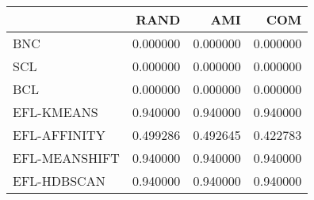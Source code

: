 \begin{tabular}{lrrr}
\toprule
 & RAND & AMI & COM \\
\midrule
BNC & 0.000000 & 0.000000 & 0.000000 \\
SCL & 0.000000 & 0.000000 & 0.000000 \\
BCL & 0.000000 & 0.000000 & 0.000000 \\
EFL-KMEANS & 0.940000 & 0.940000 & 0.940000 \\
EFL-AFFINITY & 0.499286 & 0.492645 & 0.422783 \\
EFL-MEANSHIFT & 0.940000 & 0.940000 & 0.940000 \\
EFL-HDBSCAN & 0.940000 & 0.940000 & 0.940000 \\
\bottomrule
\end{tabular}
